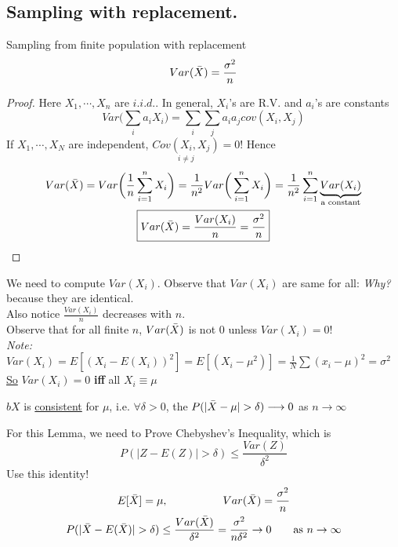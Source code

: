 \subsection*{Sampling with replacement.}
\begin{theorem}
	Sampling from finite population with replacement
	\begin{equation*}
		Var(\bar{X}) = \frac{\sigma^2}{n}
	\end{equation*}	
\end{theorem}
\begin{proof}
Here $X_1, \cdots, X_n$ are $i.i.d.$. In general, $X_i$'s are R.V. and $a_i$'s are constants
\begin{equation*}
	Var\big(\sum_i a_i X_i\big) = \sum\limits_i \sum\limits_j a_i a_j cov(X_i, X_j) 
\end{equation*}
If $X_1, \cdots, X_N$ are independent, $\underset{i \neq j}{Cov(X_i, X_j)} = 0$! Hence
\begin{gather*}
	Var(\bar{X}) = Var\bigg(\frac{1}{n} \sum\limits_{i=1}^n X_i \bigg) = \frac{1}{n^2} Var\bigg( \sum\limits_{i=1}^n X_i \bigg) = \frac{1}{n^2}  \sum\limits_{i=1}^n \underbrace{Var(X_i)}_{\text{a constant}}\\
	\boxed{Var(\bar{X}) = \frac{Var(X_i)}{n} = \frac{\sigma^2}{n}}
\end{gather*}
\end{proof}
We need to compute $Var(X_i)$. Observe that $Var(X_i)$ are same for all: \textit{Why?} because they are identical.\\
Also notice $\frac{Var(X_i)}{n}$ decreases with $n$.\\
Observe that for all finite $n$, $Var(\bar{X})$ is not 0 unless $Var(X_i) = 0$!\\
\emph{Note:} $Var(X_i) = E[(X_i - E(X_i))^2] = E[(X_i - \mu^2)] = \frac{1}{N} \sum (x_i - \mu)^2 = \sigma^2$\\
\underline{So} $Var(X_i) = 0$ \textbf{iff} all $X_i \equiv \mu$
\begin{lemma}
	$bX$ is \underline{consistent} for $\mu$, i.e. $\forall \delta > 0$, the $P(|\bar{X} - \mu| > \delta) \longrightarrow 0$ as $n\rightarrow \infty$
\end{lemma}
For this Lemma, we need to Prove Chebyshev's Inequality, which is
\begin{equation*}
	P(|Z - E(Z)| > \delta) \leq \frac{Var(Z)}{\delta^2}
\end{equation*}
Use this identity!
\begin{gather*}
	E[\bar{X}] = \mu, \hspace{5em} Var(\bar{X}) = \frac{\sigma^2}{n}\\
	P(|\bar{X} - E(\bar{X})| > \delta) \leq \frac{Var(\bar{X})}{\delta^2} = \frac{\sigma^2}{n\delta^2} \rightarrow 0 \qquad \text{as } n \rightarrow \infty
\end{gather*}
